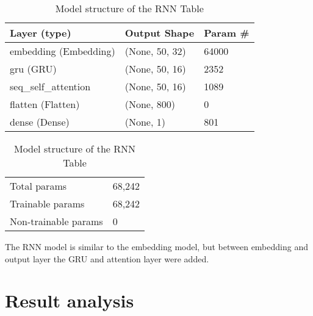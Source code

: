 \documentclass[runningheads]{llncs}
\begin{document}
\begin{table}
\centering
\begin{tabular}{|l|l|l|}
\hline
\rowcolor[HTML]{C0C0C0} 
\textbf{Layer (type)} & \textbf{Output Shape} & \textbf{Param \#} \\ \hline
embedding (Embedding) & (None, 50, 32) & 64000 \\ \hline
gru (GRU) & (None, 50, 16) & 2352 \\ \hline
seq\_self\_attention & (None, 50, 16) & 1089 \\ \hline
flatten (Flatten) & (None, 800) & 0 \\ \hline
dense (Dense) & (None, 1) & 801 \\ \hline
\end{tabular}
\caption{Model structure of the RNN Table}
\label{tab:rnn-table}

\begin{tabular}{ll}
Total params & 68,242 \\
Trainable params & 68,242 \\
Non-trainable params & 0
\end{tabular}
\end{table}

The RNN model is similar to the embedding model, but between embedding and output layer the GRU and attention layer were added.


\section{Result analysis}
\end{document}
